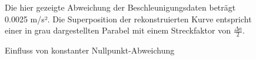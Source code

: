 \begin{figure}[ht!]
\vspace{0.25cm}
\begin{center}
\caption{Einfluss von konstanter Nullpunkt-Abweichung}
\label{fig:SzeneNoise}
\end{center}

\vspace{0.25cm}
Die hier gezeigte Abweichung der Beschleunigungsdaten beträgt 0.0025 m/s². Die Superposition der rekonstruierten Kurve entspricht einer in grau dargestellten Parabel mit einem Streckfaktor von $\frac{\Delta a}{2}$.
\end{figure}










